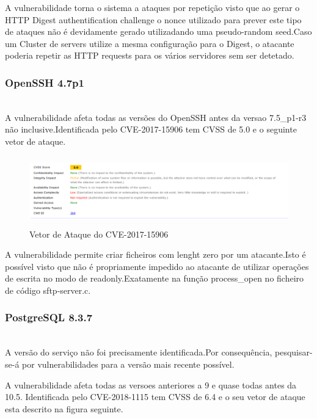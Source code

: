 A vulnerabilidade torna o sistema a ataques por repetição visto que ao gerar o HTTP Digest authentification challenge o nonce utilizado para prever este tipo de ataques não é devidamente gerado utilizadando uma pseudo-random seed.Caso um Cluster de servers utilize a mesma configuração para o Digest, o atacante poderia repetir as HTTP requests para os vários servidores sem ser detetado.

\subsubsection{OpenSSH 4.7p1}
\hfill\\

A vulnerabilidade afeta todas as versões do OpenSSH antes da versao 7.5\_p1-r3 não inclusive.Identificada pelo CVE-2017-15906 tem CVSS de 5.0 e o seguinte vetor de ataque.


\begin{figure}[h!]
	\centering
		
	\includegraphics[width=\textwidth,height=3cm,keepaspectratio]{images/openSSHCVE.png}
		
	\caption{Vetor de Ataque do CVE-2017-15906}
		
	\label{fig:openSSH}
\end{figure}

A vulnerabilidade permite criar ficheiros com lenght zero por um atacante.Isto é possível visto que não é propriamente impedido ao atacante de utilizar operações de escrita no modo de readonly.Exatamente na função process\_open no ficheiro de código sftp-server.c.

\subsubsection{PostgreSQL 8.3.7}
\hfill\\

A versão do serviço não foi precisamente identificada.Por consequência, pesquisar-se-á por vulnerabilidades para a versão mais recente possível.

A vulnerabilidade afeta todas as versoes anteriores a 9 e quase todas antes da 10.5. Identificada pelo CVE-2018-1115 tem CVSS de 6.4 e o seu vetor de ataque esta descrito na figura seguinte.


